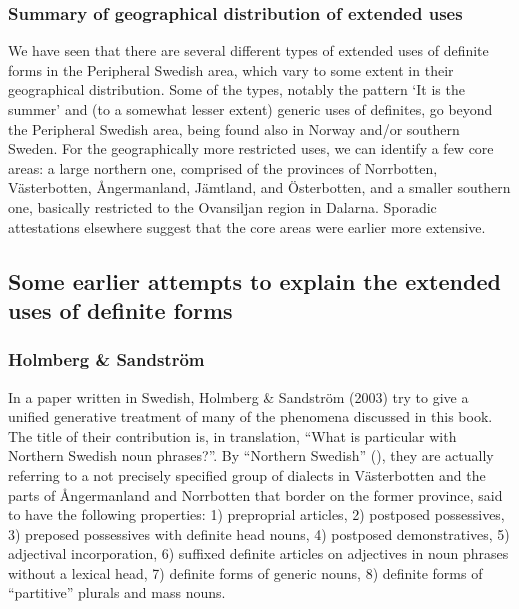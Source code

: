 \subsubsection[Summary of geographical distribution of extended uses]{\rmfamily Summary of geographical distribution of extended uses}
We have seen that there are several different types of extended uses of definite forms in the Peripheral Swedish area, which vary to some extent in their geographical distribution. Some of the types, notably the pattern  ‘It is the summer’  and (to a somewhat lesser extent) generic uses of definites, go beyond the Peripheral Swedish area, being found also in Norway and/or southern Sweden. For the geographically more restricted uses, we can identify a few core areas: a large northern one, comprised of the provinces of Norrbotten, Västerbotten, Ångermanland, Jämtland, and Österbotten, and a smaller southern one, basically restricted to the Ovansiljan region in Dalarna. Sporadic attestations elsewhere suggest that the core areas were earlier more extensive.

\subsection[Some earlier attempts to explain the extended uses of definite forms]{\rmfamily Some earlier attempts to explain the extended uses of definite forms}
\subsubsection[Holmberg \& Sandström]{\rmfamily Holmberg \& Sandström}
In a paper written in Swedish, Holmberg \& Sandström (2003) try to give a unified generative treatment of many of the phenomena discussed in this book. The title of their contribution is, in translation, “What is particular with Northern Swedish noun phrases?”. By “Northern Swedish” (), they are actually referring to a not precisely specified group of dialects in Västerbotten and the parts of Ångermanland and Norrbotten that border on the former province, said to have the following properties: 1) preproprial articles, 2) postposed possessives, 3) preposed possessives with definite head nouns, 4) postposed demonstratives, 5) adjectival incorporation, 6) suffixed definite articles on adjectives in noun phrases without a lexical head, 7) definite forms of generic nouns, 8) definite forms of “partitive” plurals and mass nouns.

